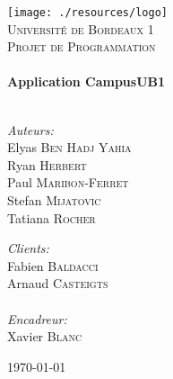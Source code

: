\begin{titlepage}
\begin{center}

\texttt{[image: ./resources/logo]}~\\[1cm]

\textsc{\LARGE Université de Bordeaux 1}\\[1.5cm]

\textsc{\Large {Projet de Programmation}}\\[0.5cm]

\HRule \\[0.4cm]
{ \huge \bfseries Application CampusUB1}\\[0.4cm]

\HRule \\[1.5cm]

\begin{minipage}{0.4\textwidth}
\begin{flushleft} \large
\emph{Auteurs:} \\
Elyas \textsc{Ben Hadj Yahia}\\
Ryan \textsc{Herbert}\\
Paul \textsc{Maribon-Ferret}\\
Stefan \textsc{Mijatovic}\\
Tatiana \textsc{Rocher}
\end{flushleft}
\end{minipage}
\begin{minipage}{0.4\textwidth}
\begin{flushright} \large
\emph{Clients:} \\
Fabien \textsc{Baldacci}\\
Arnaud \textsc{Casteigts}\\
\emph{\\Encadreur:} \\
Xavier \textsc{Blanc}
\end{flushright}
\end{minipage}

\vfill

{\large \today}

\end{center}
\end{titlepage}
